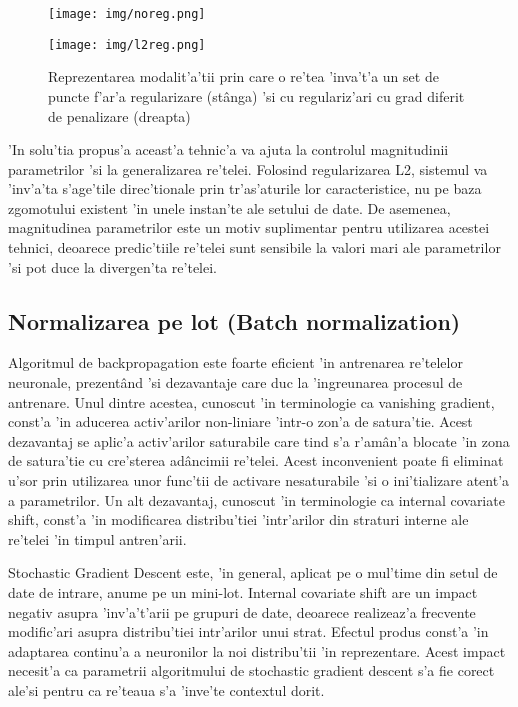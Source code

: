 \documentclass[12pt,a4paper,twoside]{report}
\begin{document}
\begin{figure}[H]
\centering
\begin{minipage}[b]{.3\textwidth}
  \centering
  \texttt{[image: img/noreg.png]}
\end{minipage}%
\begin{minipage}[b]{.5\textwidth}
  \centering
  \texttt{[image: img/l2reg.png]}
\end{minipage}
\caption{Reprezentarea modalit'a'tii prin care o re'tea 'inva't'a un set de puncte f'ar'a regularizare (st\^anga) 'si cu regulariz'ari cu grad diferit de penalizare (dreapta) \protect \footnotemark}
\label{fig:reg}
\end{figure}

'In solu'tia propus'a aceast'a tehnic'a va ajuta la controlul magnitudinii parametrilor 'si la generalizarea re'telei. Folosind regularizarea L2, sistemul va 'inv'a'ta s'age'tile direc'tionale prin tr'as'aturile lor caracteristice, nu pe baza zgomotului existent 'in unele instan'te ale setului de date. De asemenea, magnitudinea parametrilor este un motiv suplimentar pentru utilizarea acestei tehnici, deoarece predic'tiile re'telei sunt sensibile la valori mari ale parametrilor 'si pot duce la divergen'ta re'telei.

\subsection{Normalizarea pe lot (Batch normalization)}
Algoritmul de backpropagation este foarte eficient 'in antrenarea re'telelor neuronale, prezent\^and 'si dezavantaje care duc la 'ingreunarea procesul de antrenare. Unul dintre acestea, cunoscut 'in terminologie ca vanishing gradient, const'a 'in aducerea activ'arilor non-liniare 'intr-o zon'a de satura'tie. Acest dezavantaj se aplic'a activ'arilor saturabile care tind s'a r'am\^an'a blocate 'in zona de satura'tie cu cre'sterea ad\^ancimii re'telei. Acest inconvenient poate fi eliminat u'sor prin utilizarea unor func'tii de activare nesaturabile 'si o ini'tializare atent'a a parametrilor. Un alt dezavantaj, cunoscut 'in terminologie ca internal covariate shift, const'a 'in modificarea distribu'tiei 'intr'arilor din straturi interne ale re'telei 'in timpul antren'arii.

Stochastic Gradient Descent este, 'in general, aplicat pe o mul'time din setul de date de intrare, anume pe un mini-lot. Internal covariate shift are un impact negativ asupra 'inv'a't'arii pe grupuri de date, deoarece realizeaz'a frecvente modific'ari asupra distribu'tiei intr'arilor unui strat. Efectul produs const'a 'in adaptarea continu'a a neuronilor la noi distribu'tii 'in reprezentare. Acest impact necesit'a ca parametrii algoritmului de stochastic gradient descent s'a fie corect ale'si pentru ca re'teaua s'a 'inve'te contextul dorit. 
\end{document}
